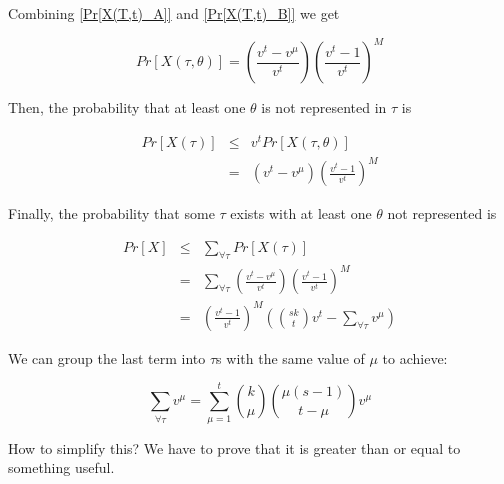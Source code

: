 \documentclass{article}
\begin{document}
Combining \ref{Pr[X(T,t)_A]} and \ref{Pr[X(T,t)_B]} we get

\begin{equation}
\label{Pr[X(T,t)]}
Pr[X(\tau, \theta)] = \left(\frac{v^t - v^\mu}{v^t} \right) \left(\frac{v^t - 1}{v^t} \right)^M
\end{equation}

Then, the probability that at least one $\theta$ is not represented in $\tau$ is

\begin{eqnarray}
Pr[X(\tau)] & \leq & v^t Pr[X(\tau, \theta)] { } \nonumber \\
                 & = & \left(v^t - v^\mu \right) \left(\frac{v^t - 1}{v^t} \right)^M
\label{Pr[X(T)]}
\end{eqnarray}

Finally, the probability that some $\tau$ exists with at least one $\theta$ not represented is

\begin{eqnarray}
Pr[X] & \leq & \sum_{\forall \tau} Pr[X(\tau)] { } \nonumber \\
      &    = & \sum_{\forall \tau} \left(\frac{v^t - v^\mu}{v^t} \right) \left(\frac{v^t - 1}{v^t} \right)^M { } \nonumber \\
      &    = & \left( \frac{ v^t - 1 }{v^t} \right)^M \left( \binom{sk}{t} v^t - \sum_{\forall \tau}{v^\mu} \right)
\end{eqnarray}

We can group the last term into $\tau$s with the same value of $\mu$ to achieve:

\begin{equation}
\sum_{\forall \tau}{v^\mu}= \sum_{\mu = 1}^{t} \binom{k}{\mu} \binom{\mu (s - 1)}{t - \mu} v^\mu
\end{equation}

How to simplify this?  We have to prove that it is greater than or equal to something useful.
\end{document}

